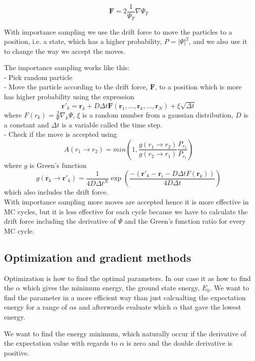 \begin{equation}\label{eq:drift_force}
\mathbf{F} = 2 \frac{1}{\Psi_T} \nabla\Psi_T
\end{equation}

With importance sampling we use the drift force to move the particles to a position, i.e. a state, which has a higher probability, $P = |\Psi|^2$, and we also use it to change the way we accept the moves. 

The importance sampling works like this:\\
- Pick random particle\\
- Move the particle according to the drift force, $\mathbf{F}$, to a position which is more has higher probability using the expression
$$ \mathbf{r}'_k = \mathbf{r}_k + D\Delta t \mathbf{F}(\mathbf{r}_1,...,\mathbf{r}_k,..., \mathbf{r}_N) + \xi \sqrt{\Delta t} $$
where $F(r_k) = \frac{2}{\Psi}\nabla_k\Psi$, $\xi$ is a random number from a gaussian distribution, $D$ is a constant and $\Delta t$ is a variable called the time step.\\
- Check if the move is accepted using
$$ A(r_1\rightarrow r_2) = min\left( 1, \frac{g(r_1\rightarrow r_2)}{g(r_2\rightarrow r_1)}\frac{P_{r_2}}{P_{r_1}}\right)$$
where $g$ is Green's function
$$ g(\mathbf{r}_k \rightarrow \mathbf{r}'_k) = \frac{1}{4 D \Delta t^N}\exp\left( \frac{-(\mathbf{r}'_k - \mathbf{r}_i - D\Delta tF(\mathbf{r}_k))}{4 D \Delta t}\right)$$ which also includes the drift force.\\

With importance sampling more moves are accepted hence it is more effective in MC cycles, but it is less effective for each cycle because we have to calculate the drift force including the derivative of $\Psi$ and the Green's function ratio for every MC cycle.

\subsection{Optimization and gradient methods}
Optimization is how to find the optimal parameters. In our case it as how to find the $\alpha$ which gives the minimum energy, the ground state energy, $E_0$. We want to find the parameter in a more efficient way than just calcualting the expectation energy for a range of $\alpha$s and afterwards evaluate which $\alpha$ that gave the lowest energy.

We want to find the energy minimum, which naturally occur if the derivative of the expectation value with regards to $\alpha$ is zero and the double derivative is positive.
